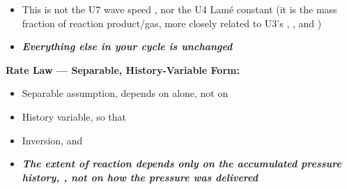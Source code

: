 \documentclass[11pt,addpoints]{exam}
\newcommand{\tbd}[1]{\textcolor{red}{#1}}
\begin{document}
\begin{tcolorbox}[breakable]
\begin{itemize}
\item This \bm{$\lambda$} is not the U7 wave speed , nor the U4 Lam\'e constant (it is the mass fraction of reaction product/gas, more closely related to U3's , , and )
\item \textbf{\emph{Everything else in your cycle is unchanged}}
\end{itemize}
\end{tcolorbox}


\begin{tcolorbox}[breakable]
\textbf{Rate Law --- Separable, History-Variable Form:}\vspace{.5em}
\begin{itemize}
\item Separable assumption, \hspace{3mm}  \hspace{5mm}  depends on \bm{$\lambda$} alone, \bm{$\Phi$} not on \bm{$\lambda$}\vspace{1.0em}
\item History variable, \hspace{3mm}  \hspace{5mm} so that \hspace{3mm} \vspace{1.0em}
\item Inversion, \hspace{3mm}  \hspace{5mm} and \hspace{3mm} \vspace{.5em}
\item \textbf{\emph{The extent of reaction depends only on the accumulated pressure history, \bm{$\phi$}, not on how the pressure was delivered}}
\end{itemize}
\end{tcolorbox}
\end{document}
